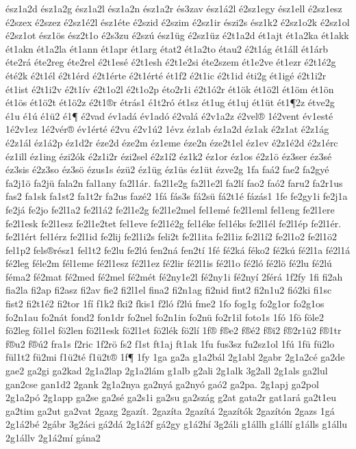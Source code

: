 {ész1a2d
ész1a2g
ész1a2l
ész1a2n
ész1a2r
és3zav
ész1á2l
é2sz1egy
ész1ell
é2sz1esz
é2szex
é2szez
é2sz1é2l
ész1éte
é2szid
é2szim
é2sz1ir
észi2s
ész1k2
é2sz1o2k
é2sz1ol
é2sz1ot
ész1ös
ész2t1o
é2s3zu
é2szú
ész1üg
é2sz1üz
é2t1a2d
ét1ajt
ét1a2ka
ét1akk
ét1akn
ét1a2la
ét1ann
ét1apr
ét1arg
état2
ét1a2to
étau2
é2t1ág
ét1áll
ét1árb
éte2rá
éte2reg
éte2rel
é2t1esé
é2t1esh
é2t1e2si
éte2szem
ét1e2ve
ét1ezr
é2t1é2g
été2k
é2t1él
é2t1érd
é2t1érte
é2t1érté
ét1f2
é2t1ic
é2t1id
éti2g
ét1igé
é2t1i2r
ét1ist
é2t1i2v
é2t1ív
é2t1o2l
é2t1o2p
éto2r1i
é2t1ó2r
ét1ök
ét1ö2l
ét1öm
ét1ön
ét1ös
ét1ö2t
ét1ö2z
é2t1®r
étrás1
é1t2ró
ét1sz
ét1ug
ét1uj
ét1üt
ét1¶2z
étve2g
é1u
é1ú
é1ü2
é1¶
é2vad
év1adá
év1adó
é2valá
é2v1a2z
é2vel®
1é2vent
év1esté
1é2v1ez
1é2vér®
év1érté
é2vu
é2v1ú2
1évz
éz1ab
éz1a2d
éz1ak
é2z1at
é2z1ág
é2z1ál
éz1á2p
éz1d2r
éze2d
éze2m
éz1eme
éze2n
éze2t1el
éz1ev
é2z1é2d
é2z1érc
éz1ill
éz1ing
ézi2ók
é2z1i2r
ézi2sel
é2z1í2
éz1k2
éz1or
éz1os
é2z1ö
éz3ser
éz3sé
éz3sis
é2z3so
éz3sö
ézus1s
ézü2
éz1üg
éz1üs
éz1üt
ézve2g
1fa
faá2
fae2
fa2gyé
fa2j1ö
fa2jü
fala2n
fal1any
fa2l1ár.
fa2l1e2g
fa2l1e2l
fa2lí
fao2
faó2
faru2
fa2r1us
fas2
fa1sk
fa1st2
fa1t2r
fa2us
fazé2
1fá
fás3s
fá2sü
fá2t1é
fázás1
1fe
fe2gy1i
fe2j1a
fe2já
fe2jo
fe2l1a2
fe2l1á2
fe2l1e2g
fe2l1e2mel
fel1emé
fe2l1eml
fel1eng
fe2l1ere
fe2l1esk
fe2l1esz
fe2l1e2tet
fel1eve
fe2l1é2g
fel1éke
fel1éks
fe2l1él
fe2l1ép
fe2l1ér.
fe2l1ért
fel1érz
fe2l1id
fe2lij
fe2l1i2s
feli2t
fe2l1ita
fe2l1iz
fe2l1í2
fe2l1o2
fe2l1ö2
fel1p2
fels®rész1
fel1t2
fe2lu
fe2lú
fen2ná
fen2tí
1fé
fé2ká
féko2
fé2kú
fé2l1a
fé2l1á
fé2leg
féle2m
fél1eme
fé2l1esz
fé2l1ez
fé2lir
fé2l1is
fé2l1o
fé2ló
fé2lö
fé2lu
fé2lú
féma2
fé2mat
fé2med
fé2mel
fé2mét
fé2ny1e2l
fé2ny1i
fé2nyí
2férá
1f2fy
1fi
fi2ah
fia2la
fi2ap
fi2asz
fi2av
fie2
fi2l1el
fina2
fi2n1ag
fi2nid
fint2
fi2n1u2
fió2ki
fi1sc
fist2
fi2t1é2
fi2tor
1fí
f1k2
fki2
fkis1
f2ló
f2lú
fme2
1fo
fog1g
fo2g1or
fo2g1os
fo2n1au
fo2nát
fond2
fon1dr
fo2nel
fo2n1in
fo2nü
fo2r1il
foto1s
1fó
1fö
föle2
fö2leg
föl1el
fö2len
fö2l1esk
fö2l1et
fö2lék
fö2lí
1f®
f®e2
f®é2
f®i2
f®2r1ü2
f®1tr
f®u2
f®ú2
fra1s
f2ric
1f2rö
fs2
f1st
ft1aj
ft1ak
1fu
fus3sz
fu2sz1ol
1fú
1fü
fü2lo
fül1t2
fü2mi
f1ü2té
f1ü2t®
1f¶
1fy
1ga
ga2a
g1a2bál
2g1abl
2gabr
2g1a2cé
ga2de
gae2
ga2gi
ga2kad
2g1a2lap
2g1a2lám
g1alb
g2ali
2g1alk
3g2all
2g1als
ga2lul
gan2cse
gan1d2
2gank
2g1a2nya
ga2nyá
ga2nyó
gaó2
ga2pa.
2g1apj
ga2pol
2g1a2pó
2g1app
ga2se
ga2sé
ga2s1i
ga2su
ga2szág
g2at
gata2r
gat1ará
ga2t1eu
ga2tim
ga2ut
ga2vat
2gazg
2gazít.
2gazíta
2gazítá
2gazítók
2gazítón
2gazs
1gá
2g1á2bé
2gábr
3g2áci
gá2dá
2g1á2f
gá2gy
g1á2hí
3g2áli
g1állh
g1állí
g1álls
g1állu
2g1állv
2g1á2mí
gána2
}
